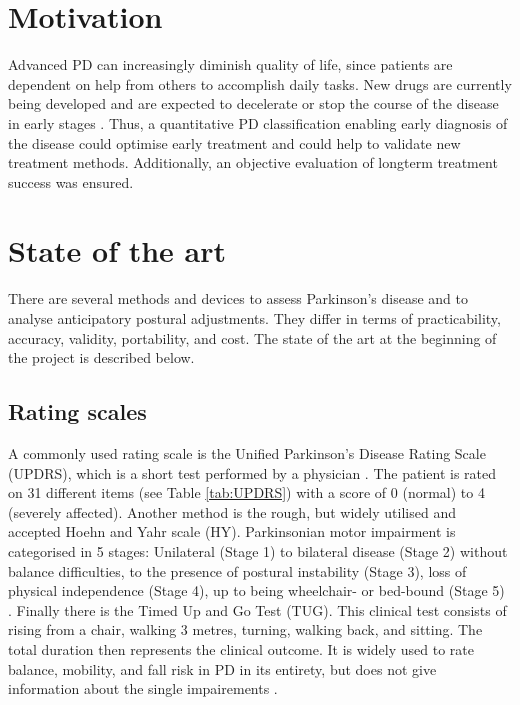 \section{Motivation}

Advanced PD can increasingly diminish quality of life, since patients are dependent on help from others to accomplish daily tasks. New drugs are currently being developed and are expected to decelerate or stop the course of the disease in early stages \cite{botzel_motivation_2014}. Thus, a quantitative PD classification enabling early diagnosis of the disease could optimise early treatment and could help to validate new treatment methods. Additionally, an objective evaluation of longterm treatment success was ensured.


\section{State of the art}

There are several methods and devices to assess Parkinson's disease and to analyse anticipatory postural adjustments. They differ in terms of practicability, accuracy, validity, portability, and cost. The state of the art at the beginning of the project is described below.

\subsection{Rating scales}

A commonly used rating scale is the Unified Parkinson’s Disease Rating Scale (UPDRS), which is a short test performed by a physician \cite{klerk_long-term_2009}. The patient is rated on 31 different items (see Table \ref{tab:UPDRS}) with a score of 0 (normal) to 4 (severely affected). Another method is the rough, but widely utilised and accepted Hoehn and Yahr scale (HY). Parkinsonian motor impairment is categorised in 5 stages: Unilateral (Stage 1) to bilateral disease (Stage 2) without balance difficulties, to the presence of postural instability (Stage 3), loss of physical independence (Stage 4), up to being wheelchair- or bed-bound (Stage 5) \cite{goetz_movement_2004}. Finally there is the Timed Up and Go Test (TUG). This clinical test consists of rising from a chair, walking 3 metres, turning, walking back, and sitting. The total duration then represents the clinical outcome. It is widely used to rate balance, mobility, and fall risk in PD in its entirety, but does not give information about the single impairements \cite{palmerini_quantification_2013}.

